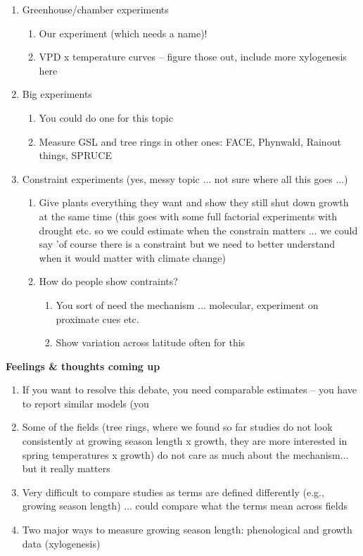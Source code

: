 \documentclass[11pt,letter]{article}
\begin{document}
\begin{enumerate}
\begin{enumerate}
\begin{enumerate}
\end{enumerate}
\item Greenhouse/chamber experiments
\begin{enumerate}
\item Our experiment (which needs a name)!
\item VPD x temperature curves -- figure those out, include more xylogenesis here
\end{enumerate}
\item Big experiments
\begin{enumerate}
\item You could do one for this topic
\item Measure GSL and tree rings in other ones: FACE, Phynwald, Rainout things, SPRUCE 
\end{enumerate}
\item Constraint experiments (yes, messy topic ... not sure where all this goes ...)
\begin{enumerate}
\item Give plants everything they want and show they still shut down growth at the same time (this goes with some full factorial experiments with drought etc. so we could estimate when the constrain matters ... we could say 'of course there is a constraint but we need to better understand when it would matter with climate change)
\item How do people show contraints?
\begin{enumerate}
\item You sort of need the mechanism ... molecular, experiment on proximate cues etc.
\item Show variation across latitude often for this
\end{enumerate}
\end{enumerate}
\end{enumerate}
\end{enumerate}

{\bf Feelings \& thoughts coming up}
\begin{enumerate}
\item If you want to resolve this debate, you need comparable estimates -- you have to report similar models (you %
\item Some of the fields (tree rings, where we found so far studies do not look consistently at growing season length x growth, they are more interested in spring temperatures x growth) do not care as much about the mechanism... but it really matters
\item Very difficult to compare studies as terms are defined differently (e.g., growing season length) ... could compare what the terms mean across fields
\item Two major ways to measure growing season length: phenological and growth data (xylogenesis)
\end{enumerate}
\end{document}
